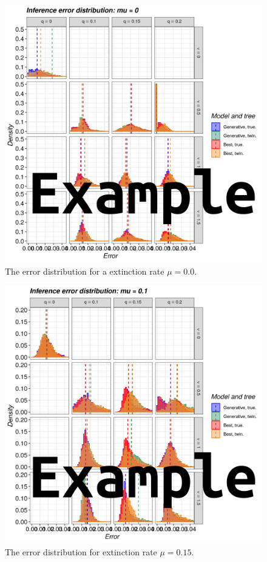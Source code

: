 \begin{figure}[!htbp]
  \includegraphics[width=\textwidth]{figure_1a.png}
  \caption{
    The error distribution for a extinction rate $\mu = 0.0$.
  }
  \label{fig:errors_yule}
\end{figure}

\begin{figure}[!htbp]
  \includegraphics[width=\textwidth]{figure_1b.png}
  \caption{
    The error distribution for extinction rate $\mu = 0.15$.
  }
  \label{fig:errors_bd}
\end{figure}

